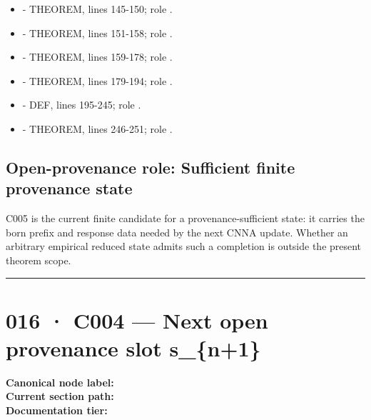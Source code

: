\begin{itemize}
  \texttt{\protect{}} - THEOREM, lines
  139-144; role \texttt{\protect{}}.
\item
  \texttt{\protect{}} - THEOREM,
  lines 145-150; role \texttt{\protect{}}.
\item
  \texttt{\protect{}} - THEOREM, lines 151-158; role
  \texttt{\protect{}}.
\item
  \texttt{\protect{}} - THEOREM, lines 159-178; role
  \texttt{\protect{}}.
\item
  \texttt{\protect{}} - THEOREM, lines 179-194;
  role \texttt{\protect{}}.
\item
  \texttt{\protect{}} - DEF, lines 195-245; role \texttt{\protect{}}.
\item
  \texttt{\protect{}} - THEOREM, lines 246-251; role
  \texttt{\protect{}}.
\end{itemize}

\subsection{Open-provenance role: Sufficient finite provenance
state}\label{open-provenance-role-sufficient-finite-provenance-state}

C005 is the current finite candidate for a provenance-sufficient state:
it carries the born prefix and response data needed by the next CNNA
update. Whether an arbitrary empirical reduced state admits such a
completion is outside the present theorem scope.

\begin{center}\rule{0.5\linewidth}{0.5pt}\end{center}

\section{016 · C004 --- Next open provenance slot
s\_\{n+1\}}\label{c004-next-open-provenance-slot-s_n1}

\textbf{Canonical node label:} \texttt{\protect{}}\\
\textbf{Current section path:} \texttt{\protect{}}\\
\textbf{Documentation tier:} \texttt{\protect{}}

